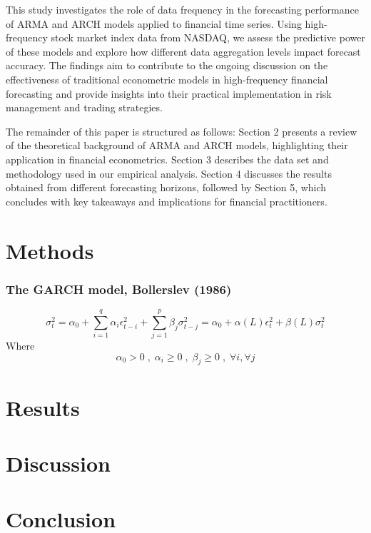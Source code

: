 \documentclass[a4paper, 12pt]{article}
\begin{document}
This study investigates the role of data frequency in the forecasting performance of ARMA and ARCH models applied to financial time series. Using high-frequency stock market index data from NASDAQ, we assess the predictive power of these models and explore how different data aggregation levels impact forecast accuracy. The findings aim to contribute to the ongoing discussion on the effectiveness of traditional econometric models in high-frequency financial forecasting and provide insights into their practical implementation in risk management and trading strategies.

The remainder of this paper is structured as follows: Section 2 presents a review of the theoretical background of ARMA and ARCH models, highlighting their application in financial econometrics. Section 3 describes the data set and methodology used in our empirical analysis. Section 4 discusses the results obtained from different forecasting horizons, followed by Section 5, which concludes with key takeaways and implications for financial practitioners.


\part{Methods}

\section{The GARCH model, Bollerslev (1986)}

\[ \sigma_t^2=\alpha_0+\sum_{i=1}^{q}\alpha_i\epsilon_{t-i}^2+\sum_{j=1}^{p}\beta_j\sigma_{t-j}^2=\alpha_0+\alpha(L)\epsilon_t^2+\beta(L)\sigma_t^2\] 
Where 
\[ \alpha_0>0 \; , \; \alpha_i \ge 0 \; , \; \beta_j \ge 0 \; ,\; \forall i, \forall j\]


\part{Results}


\part{Discussion}



\part{Conclusion}
\end{document}
